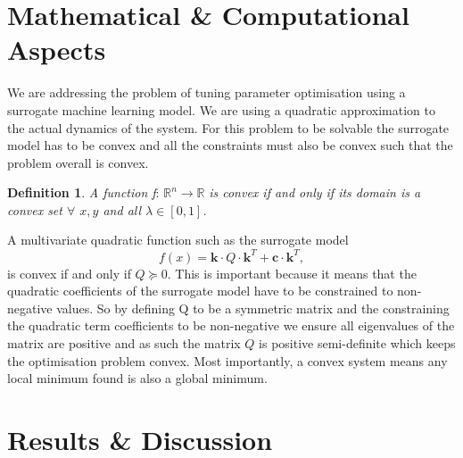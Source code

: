 \documentclass[conference]{IEEEtran}
\theoremstyle{definition}
\newtheorem{definition}{Definition}[section]
\begin{document}
\section{Mathematical \& Computational Aspects}
\noindent We are addressing the problem of tuning parameter optimisation using a surrogate machine learning model. We are using a quadratic approximation to the actual dynamics of the system. For this problem to be solvable the surrogate model has to be convex and all the constraints must also be convex such that the problem overall is convex. \\
\theoremstyle{definition}
\begin{definition}
\textit{A function f}: $\mathbb{R}^n \rightarrow \mathbb{R}$ \textit{is convex if and only if its domain is a convex set $\forall$ $x, y$ and all $\lambda \in [0,1]$. } 
\end{definition}
\noindent A multivariate quadratic function such as the surrogate model
\begin{equation}
    f(x) = \mathbf{k} \cdot Q \cdot \mathbf{k}^T + \mathbf{c} \cdot \mathbf{k}^T,
\end{equation}
is convex if and only if $Q \succcurlyeq 0$. This is important because it means that the quadratic coefficients of the surrogate model have to be constrained to non-negative values. So by defining Q to be a symmetric matrix and the constraining the quadratic term coefficients to be non-negative we ensure all eigenvalues of the matrix are positive and as such the matrix $Q$ is positive semi-definite which keeps the optimisation problem convex. Most importantly, a convex system means any local minimum found is also a global minimum. 

\section{Results \& Discussion}
\end{document}
